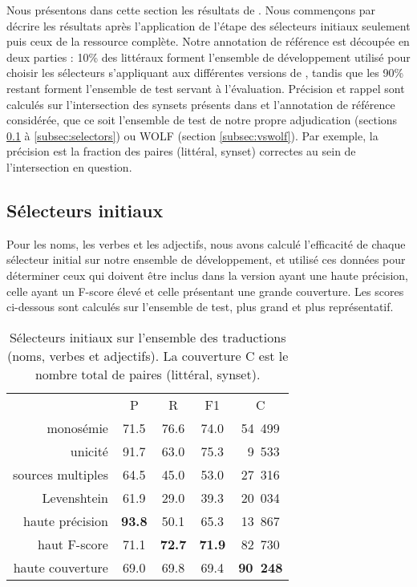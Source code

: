 Nous présentons dans cette section les résultats de \newjaws{}. Nous commençons par décrire les résultats après l'application de l'étape des sélecteurs initiaux seulement puis ceux de la ressource complète. Notre annotation de référence est découpée en deux parties : 10\% des littéraux forment l'ensemble de développement utilisé pour choisir les sélecteurs s'appliquant aux différentes versions de \newjaws{}, tandis que les 90\% restant forment l'ensemble de test servant à l'évaluation. Précision et rappel sont calculés sur l'intersection des synsets présents dans \newjaws{} et l'annotation de référence considérée, que ce soit l'ensemble de test de notre propre adjudication (sections \ref{subsec:heuristics} à \ref{subsec:selectors}) ou WOLF (section \ref{subsec:vswolf}). Par exemple, la précision est la fraction des paires (littéral, synset) correctes au sein de l'intersection en question.

\subsection{Sélecteurs initiaux}
\label{subsec:heuristics}

Pour les noms, les verbes et les adjectifs, nous avons calculé l'efficacité de chaque sélecteur initial sur notre ensemble de développement, et utilisé ces données pour déterminer ceux qui doivent être inclus dans la version ayant une haute précision, celle ayant un F-score élevé et celle présentant une grande couverture. Les scores ci-dessous sont calculés sur l'ensemble de test, plus grand et plus représentatif.

\let\b\textbf

\begin{table}[ht]
\centering
\begin{tabular}{rcccc}
  \toprule
                    & P & R & F1 & C \\
  monosémie         & 71.5 & 76.6 & 74.0 & 54~499 \\
  unicité           & 91.7 & 63.0 & 75.3 & ~9~533 \\
  sources multiples & 64.5 & 45.0 & 53.0 & 27~316 \\
  Levenshtein       & 61.9 & 29.0 & 39.3 & 20~034 \\
  \midrule
  haute précision   & \b{93.8} & 50.1     & 65.3     & 13~867 \\
  haut F-score      & 71.1     & \b{72.7} & \b{71.9} & 82~730 \\
  haute couverture  & 69.0     & 69.8     & 69.4     & \b{90~248} \\
  \bottomrule
\end{tabular}
\caption{\protect\centering\label{table:heuristics}Sélecteurs initiaux sur l'ensemble des traductions (noms, verbes et adjectifs). La couverture C est le nombre total de paires (littéral, synset).}
\end{table}

